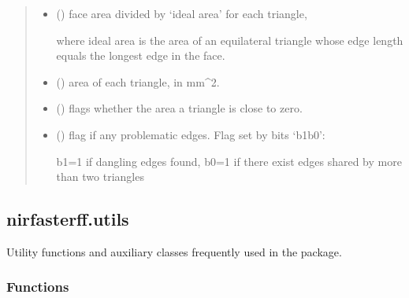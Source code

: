 \documentclass[letterpaper,10pt,english]{sphinxmanual}
\begin{document}
\begin{fulllineitems}
\begin{quote}
\begin{description}
\begin{itemize}
\item {} 
\sphinxAtStartPar
{} () \textendash{} face area divided by ‘ideal area’ for each triangle,

\sphinxAtStartPar
where ideal area is the area of an equilateral triangle whose edge length equals the longest edge in the face.

\item {} 
\sphinxAtStartPar
{} () \textendash{} area of each triangle, in mm\textasciicircum{}2.

\item {} 
\sphinxAtStartPar
{} () \textendash{} flags whether the area a triangle is close to zero.

\item {} 
\sphinxAtStartPar
{} () \textendash{} flag if any problematic edges. Flag set by bits ‘b1b0’:

\sphinxAtStartPar
b1=1 if dangling edges found, b0=1 if there exist edges shared by more than two triangles

\end{itemize}


\end{description}\end{quote}

\end{fulllineitems}


\sphinxstepscope


\subsection{nirfasterff.utils}
\label{\detokenize{_autosummary/nirfasterff.utils:module-nirfasterff.utils}}\label{\detokenize{_autosummary/nirfasterff.utils:nirfasterff-utils}}\label{\detokenize{_autosummary/nirfasterff.utils::doc}}
\sphinxAtStartPar
Utility functions and auxiliary classes frequently used in the package.
\subsubsection*{Functions}
\end{document}
